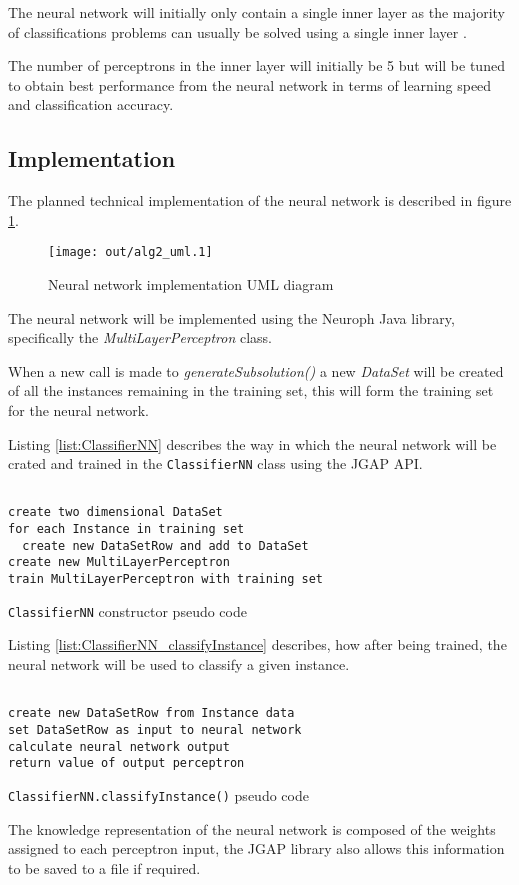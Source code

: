 \documentclass[a4paper]{article}
\begin{document}
The neural network will initially only contain a single inner layer as the
majority of classifications problems can usually be solved using a single inner
layer \cite{nninjava}.

The number of perceptrons in the inner layer will initially be 5 but will be
tuned to obtain best performance from the neural network in terms of learning
speed and classification accuracy.

\subsection{Implementation}

The planned technical implementation of the neural network is described in
figure \ref{fig:alg2_uml}.

\begin{figure}[h!]
  \centering
  \texttt{[image: out/alg2\_uml.1]}
  \caption{Neural network implementation UML diagram}
  \label{fig:alg2_uml}
\end{figure}

The neural network will be implemented using the Neuroph \cite{neuroph} Java
library, specifically the \textit{MultiLayerPerceptron} class.

When a new call is made to \textit{generateSubsolution()} a new \textit{DataSet}
will be created of all the instances remaining in the training set, this will
form the training set for the neural network.

Listing \ref{list:ClassifierNN} describes the way in which the neural network
will be crated and trained in the \texttt{ClassifierNN} class using the JGAP
API.

\begin{listing}[H]
  \begin{verbatim}

create two dimensional DataSet
for each Instance in training set
  create new DataSetRow and add to DataSet
create new MultiLayerPerceptron
train MultiLayerPerceptron with training set

  \end{verbatim}
  \caption{\texttt{ClassifierNN} constructor pseudo code}
  \label{list:ClassifierNN}
\end{listing}

Listing \ref{list:ClassifierNN_classifyInstance} describes, how after being
trained, the neural network will be used to classify a given instance.

\begin{listing}[H]
  \begin{verbatim}

create new DataSetRow from Instance data
set DataSetRow as input to neural network
calculate neural network output
return value of output perceptron

  \end{verbatim}
  \caption{\texttt{ClassifierNN.classifyInstance()} pseudo code}
  \label{list:ClassifierNN_classifyInstance}
\end{listing}

The knowledge representation of the neural network is composed of the weights
assigned to each perceptron input, the JGAP library also allows this information
to be saved to a file if required.

\printbibliography
\end{document}
